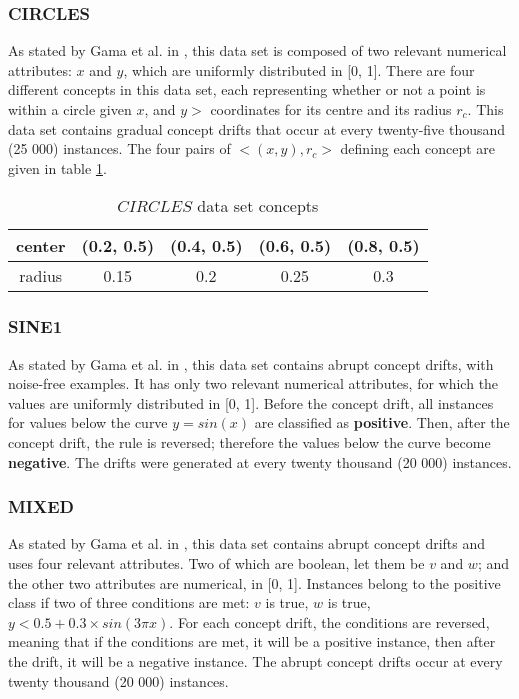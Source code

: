 \subsubsection{CIRCLES}
As stated by Gama et al. in \cite{gama2004learning}, this data set is composed of two relevant numerical attributes: $x$ and $y$, which are uniformly distributed in [0, 1]. There are four different concepts in this data set, each representing whether or not a point is within a circle given $x$, and $y>$ coordinates for its centre and its radius $r_c$. This data set contains gradual concept drifts that occur at every twenty-five thousand (25 000) instances. The four pairs of $<(x,y), r_c>$ defining each concept are given in table \ref{table:circle_concepts}.

\begin{table}[]
\centering
\caption{\label{table:circle_concepts}$CIRCLES$ data set concepts}
\begin{tabular}{|c|c|c|c|c|}
\hline
center & (0.2, 0.5) & (0.4, 0.5) & (0.6, 0.5) & (0.8, 0.5) \\ \hline
radius & 0.15       & 0.2        & 0.25       & 0.3        \\ \hline
\end{tabular}
\end{table}

\subsubsection{SINE1}
As stated by Gama et al. in \cite{gama2004learning}, this data set contains abrupt concept drifts, with noise-free examples. It has only two relevant numerical attributes, for which the values are uniformly distributed in [0, 1]. Before the concept drift, all instances for values below the curve $y = sin(x)$ are classified as \textbf{positive}. Then, after the concept drift, the rule is reversed; therefore the values below the curve become \textbf{negative}. The drifts were generated at every twenty thousand (20 000) instances.

\subsubsection{MIXED}
As stated by Gama et al. in \cite{gama2004learning}, this data set contains abrupt concept drifts and uses four relevant attributes. Two of which are boolean, let them be $v$ and $w$; and the other two attributes are numerical, in [0, 1]. Instances belong to the positive class if two of three conditions are met: $v$ is true, $w$ is true, $y < 0.5 + 0.3 \times sin(3\pi x)$. For each concept drift, the conditions are reversed, meaning that if the conditions are met, it will be a positive instance, then after the drift, it will be a negative instance. The abrupt concept drifts occur at every twenty thousand (20 000) instances.

